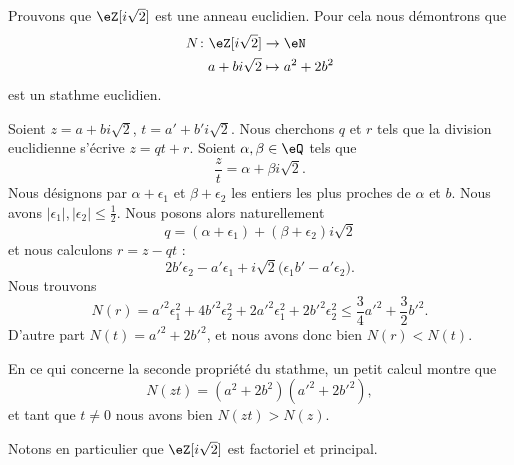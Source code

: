 \begin{example} \label{ExeDufyZI}
    Prouvons que \( \eZ[i\sqrt{2}]\) est une anneau euclidien. Pour cela nous démontrons que
    \begin{equation}    \label{EqOZUIooZGmHWl}
        \begin{aligned}
            N\colon \eZ[i\sqrt{2}]&\to \eN \\
            a+bi\sqrt{2}&\mapsto a^2+2b^2 
        \end{aligned}
    \end{equation}
    est un stathme euclidien.    

    Soient \( z=a+bi\sqrt{2}\), \( t=a'+b'i\sqrt{2}\). Nous cherchons \( q\) et \( r\) tels que la division euclidienne s'écrive \( z=qt+r\). Soient \( \alpha,\beta\in \eQ\) tels que 
    \begin{equation}
        \frac{ z }{ t }=\alpha+\beta i\sqrt{2}.
    \end{equation}
    Nous désignons par \( \alpha+\epsilon_1\) et \( \beta+\epsilon_2\) les entiers les plus proches de \( \alpha\) et \( b\). Nous avons \( | \epsilon_1 |,| \epsilon_2 |\leq \frac{ 1 }{2}\). Nous posons alors naturellement 
    \begin{equation}
        q=(\alpha+\epsilon_1)+(\beta+\epsilon_2)i\sqrt{2}
    \end{equation}
    et nous calculons \( r=z-qt\) :
    \begin{equation}
        2b'\epsilon_2-a'\epsilon_1+i\sqrt{2}\big( \epsilon_1b'-a'\epsilon_2 \big).
    \end{equation}
    Nous trouvons 
    \begin{equation}
        N(r)=a'^2\epsilon_1^2+4b'^2\epsilon_2^2+2a'^2\epsilon_1^2+2b'^2\epsilon_2^2\leq \frac{ 3 }{ 4 }a'^2+\frac{ 3 }{2}b'^2.
    \end{equation}
    D'autre part \( N(t)=a'^2+2b'^2\), et nous avons donc bien \( N(r)<N(t)\).

    En ce qui concerne la seconde propriété du stathme, un petit calcul montre que
    \begin{equation}
        N(zt)=(a^2+2b^2)(a'^2+2b'^2),
    \end{equation}
    et tant que \( t\neq 0\) nous avons bien \( N(zt)>N(z)\).
\end{example}

Notons en particulier que \( \eZ[i\sqrt{2}]\) est factoriel et principal.

